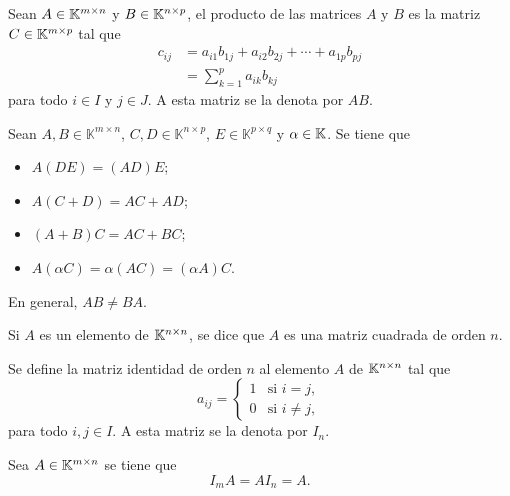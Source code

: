 \documentclass[a4,11pt]{aleph-notas}
\begin{document}
\begin{defi}
    Sean $A \in \Mat[\K]{m}{n}$ y $B \in \Mat[\K]{n}{p}$, el producto de las matrices $A$ y $B$ es la matriz $C \in \Mat[\K]{m}{p}$ tal que
    \begin{align*}
        c_{ij} & = a_{i1}b_{1j} + a_{i2} b_{2j} + \cdots + a_{1p}b_{pj} \\
               & = \sum_{k=1}^p a_{ik} b_{kj}
    \end{align*}
    para todo $i \in I$ y $j \in J$. A esta matriz se la denota por $AB$.
\end{defi}



\begin{teo}
    Sean $A, B\in \mathbb{K}^{m \times n}$, $C,D\in \mathbb{K}^{n \times p}$, $E\in \mathbb{K}^{p \times q}$ y $\alpha \in\K$. Se tiene que
    \begin{itemize}
    \item 
        $A(DE) = (AD)E$;
    \item 
        $A(C+D) = AC + AD$; 
    \item 
        $(A+B)C = AC + BC$; 
    
    \item 
        $A(\alpha C) = \alpha (AC) = (\alpha A) C$.
    \end{itemize}
\end{teo}

\begin{advertencia}
    En general, $AB\neq BA$.
\end{advertencia}

\begin{defi}
    Si $A$ es un elemento de $\K^{n \times n}$, se dice que $A$ es una matriz cuadrada de orden $n$. 
\end{defi}

\begin{defi}
    Se define la matriz identidad de orden $n$ al elemento $A$ de $\K^{n \times n}$ tal que
    \[
        a_{ij} =
            \begin{cases}
            1 & \text{si } i=j, \\
            0 & \text{si } i \neq j,
            \end{cases}
    \]
    para todo $i,j\in I$. A esta matriz se la denota por $I_n$.
\end{defi} 

\begin{prop}
    Sea $A\in\Mat[\K]{m}{n}$ se tiene que
    \[ 
        I_m A = A I_n = A.
    \]
\end{prop}
\end{document}
